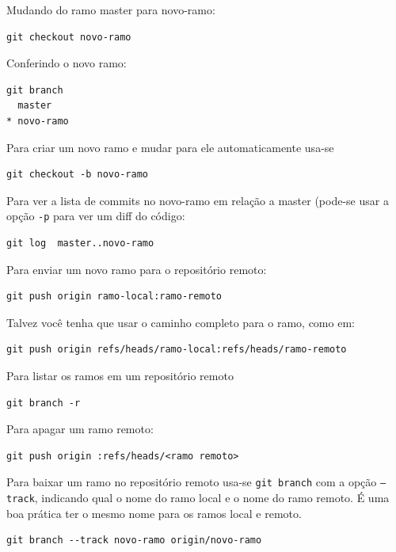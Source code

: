 \documentclass[12pt,brazil]{book}
\begin{document}
Mudando do ramo master para novo-ramo:

\begin{verbatim}
git checkout novo-ramo
\end{verbatim}

Conferindo o novo ramo:

\begin{verbatim}
git branch
  master
* novo-ramo
\end{verbatim}

Para criar um novo ramo e mudar para ele automaticamente usa-se

\begin{verbatim}
git checkout -b novo-ramo
\end{verbatim}

Para ver a lista de commits no novo-ramo em relação a master (pode-se
usar a opção \texttt{-p} para ver um diff do código:

\begin{verbatim}
git log  master..novo-ramo
\end{verbatim}

Para enviar um novo ramo para o repositório remoto:

\begin{verbatim}
git push origin ramo-local:ramo-remoto
\end{verbatim}

Talvez você tenha que usar o caminho completo para o ramo, como em:

\begin{verbatim}
git push origin refs/heads/ramo-local:refs/heads/ramo-remoto
\end{verbatim}

Para listar os ramos em um repositório remoto

\begin{verbatim}
git branch -r
\end{verbatim}

Para apagar um ramo remoto:

\begin{verbatim}
git push origin :refs/heads/<ramo remoto>
\end{verbatim}

Para baixar um ramo no repositório remoto usa-se \texttt{git branch}
com a opção \texttt{--track}, indicando qual o nome do ramo local e o
nome do ramo remoto. É uma boa prática ter o mesmo nome para os ramos
local e remoto.

\begin{verbatim}
git branch --track novo-ramo origin/novo-ramo
\end{verbatim}
\end{document}

